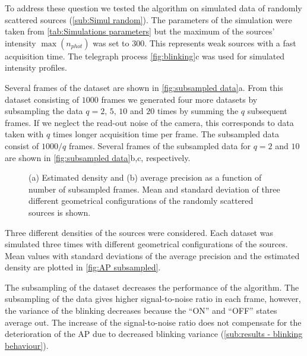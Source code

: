 To address these question we tested the algorithm on simulated data of randomly scattered sources (\autoref{sub:Simul random}). The parameters of the simulation were taken from \autoref{tab:Simulations parameters} but the maximum of the sources' intensity $\max(n_{phot})$ was set to 300. This represents weak sources with a fast acquisition time. The telegraph process \autoref{fig:blinking}c was used for simulated intensity profiles. 

Several frames of the dataset are shown in \autoref{fig:subsampled data}a. From this dataset consisting of $1000$ frames we generated four more datasets by subsampling the data $q=2,\,5,\,10$ and $20$ times by summing the $q$ subsequent frames. If  we neglect the read-out noise of the camera, this corresponds to data taken with $q$ times longer acquisition time per frame. The subsampled data consist of $1000/q$ frames. Several frames of the subsampled data for $q=2$ and $10$ are shown in \autoref{fig:subsampled data}b,c, respectively. 
%
\begin{figure}[!htb]	
	\newcommand{\wf}{.45\textwidth}
	\newcommand{\sizef}{.38}
	\centering
	\caption{(a) Estimated density and (b) average precision as a function of number of subsampled frames. Mean and standard deviation of three different geometrical configurations of the randomly scattered sources is shown.}
	\label{fig:AP subsampled}
\end{figure}

Three different densities of the sources were considered. Each dataset was simulated three times   with different geometrical configurations of the sources. Mean values with standard deviations of the average precision and the estimated density are plotted in \autoref{fig:AP subsampled}. 

The subsampling of the dataset decreases the performance of the algorithm. The subsampling of the data gives higher signal-to-noise ratio in each frame, however, the variance of the blinking decreases because the ``ON'' and ``OFF'' states average out. The increase of the signal-to-noise ratio does not compensate for the deterioration of the AP due to decreased blinking variance (\autoref{sub:results - blinking behaviour}). 


